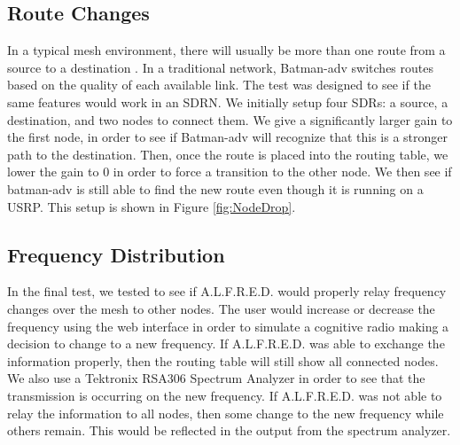 \subsection{Route Changes}

In a typical mesh environment, there will usually be more than one route from a source to a destination \cite{Akyildiz2009810}. In a traditional network, Batman-adv switches routes based on the quality of each available link. The test was designed to see if the same features would work in an SDRN. We initially setup four SDRs: a source, a destination, and two nodes to connect them. We give a significantly larger gain to the first node, in order to see if Batman-adv will recognize that this is a stronger path to the destination. Then, once the route is placed into the routing table, we lower the gain to 0 in order to force a transition to the other node. We then see if batman-adv is still able to find the new route even though it is running on a USRP. This setup is shown in Figure \ref{fig:NodeDrop}.



\subsection{Frequency Distribution}

In the final test, we tested to see if A.L.F.R.E.D. would properly relay frequency changes over the mesh to other nodes. The user would increase or decrease the frequency using the web interface in order to simulate a cognitive radio making a decision to change to a new frequency. If A.L.F.R.E.D. was able to exchange the information properly, then the routing table will still show all connected nodes. We also use a Tektronix RSA306 Spectrum Analyzer in order to see that the transmission is occurring on the new frequency. If A.L.F.R.E.D. was not able to relay the information to all nodes, then some change to the new frequency while others remain. This would be reflected in the output from the spectrum analyzer. 